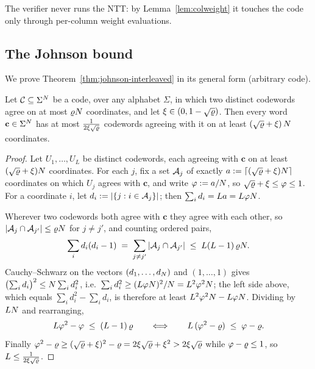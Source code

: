 The verifier never runs the NTT: by Lemma~\ref{lem:colweight} it touches the code only through per-column weight evaluations.

\subsection{The Johnson bound}\label{app:johnson}

We prove Theorem~\ref{thm:johnson-interleaved} in its general form (arbitrary code).

\begin{theorem}\label{thm:johnson-general}
Let $\mathcal{C} \subseteq \Sigma^N$ be a code, over any alphabet $\Sigma$, in which two distinct codewords agree on at most $\varrho N$ coordinates, and let $\xi \in (0, 1 - \sqrt{\varrho})$. Then every word $\mathbf{c} \in \Sigma^N$ has at most $\tfrac{1}{2\xi\sqrt{\varrho}}$ codewords agreeing with it on at least $(\sqrt{\varrho} + \xi)\, N$ coordinates.
\end{theorem}

\begin{proof}
Let $U_1, \dots, U_L$ be distinct codewords, each agreeing with $\mathbf{c}$ on at least $(\sqrt{\varrho}+\xi) N$ coordinates. For each $j$, fix a set $\mathcal{A}_j$ of exactly $a := \lceil (\sqrt{\varrho}+\xi) N \rceil$ coordinates on which $U_j$ agrees with $\mathbf{c}$, and write $\varphi := a/N$, so $\sqrt{\varrho} + \xi \le \varphi \le 1$. For a coordinate $i$, let $d_i := |\{ j : i \in \mathcal{A}_j \}|$; then $\sum_i d_i = L a = L \varphi N$.

Wherever two codewords both agree with $\mathbf{c}$ they agree with each other, so $|\mathcal{A}_j \cap \mathcal{A}_{j'}| \le \varrho N$ for $j \neq j'$, and counting ordered pairs,
\[
\sum_i d_i (d_i - 1) \;=\; \sum_{j \neq j'} |\mathcal{A}_j \cap \mathcal{A}_{j'}| \;\le\; L(L-1)\, \varrho N .
\]
Cauchy--Schwarz on the vectors $(d_1, \dots, d_N)$ and $(1, \dots, 1)$ gives $\bigl(\sum_i d_i\bigr)^2 \le N \sum_i d_i^2$, i.e.\ $\sum_i d_i^2 \ge (L \varphi N)^2 / N = L^2 \varphi^2 N$; the left side above, which equals $\sum_i d_i^2 - \sum_i d_i$, is therefore at least $L^2 \varphi^2 N - L \varphi N$. Dividing by $LN$ and rearranging,
\[
L \varphi^2 - \varphi \;\le\; (L-1)\, \varrho
\qquad\Longleftrightarrow\qquad
L\, (\varphi^2 - \varrho) \;\le\; \varphi - \varrho .
\]
Finally $\varphi^2 - \varrho \ge (\sqrt{\varrho}+\xi)^2 - \varrho = 2\xi\sqrt{\varrho} + \xi^2 > 2\xi\sqrt{\varrho}$ while $\varphi - \varrho \le 1$, so $L \le \tfrac{1}{2\xi\sqrt{\varrho}}$.
\end{proof}
